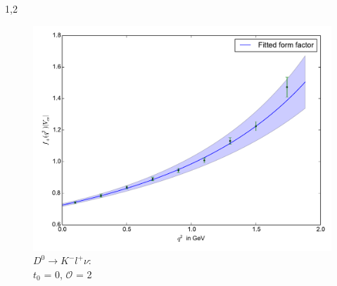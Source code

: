 \documentclass[11pt,a4paper,twoside,draft]{report}
\begin{document}
\begin{spacing}{1,2}
\begin{minipage}[H]{0.45\textwidth}
\begin{figure}[H]
 \includegraphics[width=1\textwidth]{Fit/D0-2Ord-0.pdf}
 \caption{$D^0\rightarrow K^- l^+ \nu$: \\$t_0$ = 0, $\mathcal{O}$ = 2}
 \label{pic_D0-2Ord-0}
 \end{figure}
 \end{minipage}
 

\end{spacing}
\end{document}
